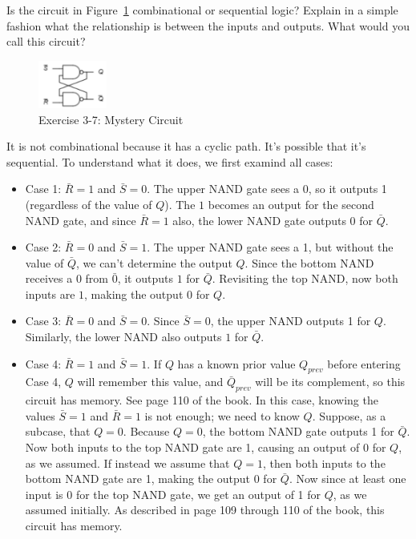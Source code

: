 \documentclass[12pt]{article}
\newenvironment{ex}[2][Exercise]{\begin{trivlist}
		\item[\hskip \labelsep {\bfseries #1}\hskip \labelsep {\bfseries #2.}]}{\end{trivlist}}
\newenvironment{sol}[1][Solution]{\begin{trivlist}
		\item[\hskip \labelsep {\bfseries #1:}]}{\end{trivlist}}
\begin{document}
\begin{ex}{3.7}
	Is the circuit in Figure~\ref{03-07-nand-latch} combinational or sequential logic?
	Explain in a simple fashion what the relationship is between the
	inputs and outputs. What would you call this circuit?
	\begin{figure}[h]
		\centering
		\includegraphics[width=0.2\textwidth]{03-07-nand-latch}
		\caption{Exercise 3-7: Mystery Circuit}
		\label{03-07-nand-latch}
	\end{figure}
\end{ex}

\begin{sol}
	It is not combinational because it has a cyclic path. It's possible that it's sequential. To understand what it does, we first examind all cases:
	\begin{itemize}
		\item Case 1: $\bar{R}=1$ and $\bar{S}=0$. The upper NAND gate sees a
		0, so it outputs 1 (regardless of the value of $Q$). The $1$ becomes an output for the second NAND gate, and since $\bar{R}=1$ also, the lower
		NAND gate outputs 0 for $\bar{Q}$.
		\item Case 2: $\bar{R}=0$ and $\bar{S}=1$. The upper NAND gate sees a 1,
		but without the value of $\bar{Q}$, we can't determine the output $Q$.
		Since the bottom NAND receives a 0 from $\bar{0}$, it outputs $1$
		for $\bar{Q}$. Revisiting the top NAND, now both inputs are $1$, making
		the output $0$ for $Q$.
		\item Case 3: $\bar{R}=0$ and $\bar{S}=0$. Since
		$\bar{S}=0$, the upper NAND outputs 1 for $Q$. Similarly, the lower NAND also outputs $1$ for $\bar{Q}$.
		\item Case 4: $\bar{R}=1$ and $\bar{S}=1$. If $Q$ has a known prior
		value $Q_{prev}$ before entering Case 4, $Q$ will remember this value,
		and $\bar{Q}_{prev}$ will be its complement, so this circuit has memory.
		See page 110 of the book.
		In this case, knowing the values $\bar{S}=1$ and $\bar{R}=1$ is not enough; we need to know $Q$. Suppose, as a subcase, that $Q=0$. Because $Q=0$, the bottom NAND gate outputs 1 for $\bar{Q}$. Now both inputs to the top NAND gate are 1, causing an output of $0$ for $Q$, as we assumed. If instead we assume that $Q=1$, then both inputs to the bottom NAND gate are 1, making the output 0 for $\bar{Q}$. Now since at least one input is $0$ for the top NAND gate, we get an output of 1 for $Q$, as we assumed initially. As described in page 109 through 110 of the book, this circuit has memory.

\end{itemize}
\end{sol}
\end{document}
